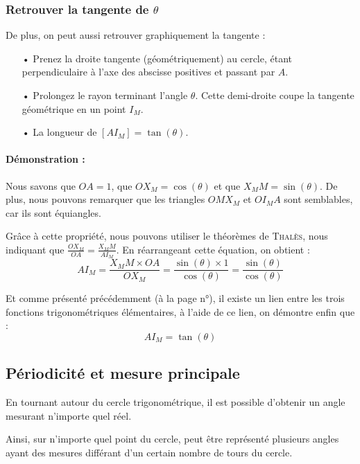 \documentclass[a4paper]{article}
\begin{document}
			\subsubsection{Retrouver la tangente de $\theta$}
			De plus, on peut aussi retrouver graphiquement la tangente :
			\begin{itemize}
				\item [•] Prenez la droite tangente (géométriquement) au cercle, étant perpendiculaire à l'axe des abscisse positives et passant par $A$.
				\item [•] Prolongez le rayon terminant l'angle $\theta$. Cette demi-droite coupe la tangente géométrique en un point $I_M$.
				\item [•] La longueur de $[AI_M] = \tan(\theta)$.
			\end{itemize}

			\vspace{-0.25cm}

			\paragraph*{Démonstration :} Nous savons que $OA = 1$, que $OX_M = \cos(\theta)$ et que $X_MM = \sin(\theta)$.
			De plus, nous pouvons remarquer que les triangles $OMX_M$ et $OI_MA$ sont semblables, car ils sont équiangles.

			Grâce à cette propriété, nous pouvons utiliser le théorèmes de \textsc{Thalès}, nous indiquant que $\frac{OX_M}{OA} = \frac{X_MM}{AI_M}$.
			En réarrangeant cette équation, on obtient : 
				$${AI_M} = \frac{X_MM \times OA}{OX_M} = \frac{\sin(\theta) \times 1}{\cos(\theta)} = \frac{\sin(\theta)}{\cos(\theta)}$$

			Et comme présenté précédemment (à la page n°\pageref{lien_fct_trigo}), 
			il existe un lien entre les trois fonctions trigonométriques élémentaires, 
			à l'aide de ce lien, on démontre enfin que : 
				$${AI_M} = \tan(\theta)$$

\newpage

		\subsection{Périodicité et mesure principale}

			En tournant autour du cercle trigonométrique,
			il est possible d'obtenir un angle mesurant n'importe quel réel.
			
			Ainsi, sur n'importe quel point du cercle,
			peut être représenté plusieurs angles ayant des mesures
			différant d'un certain nombre de tours du cercle.
\end{document}

